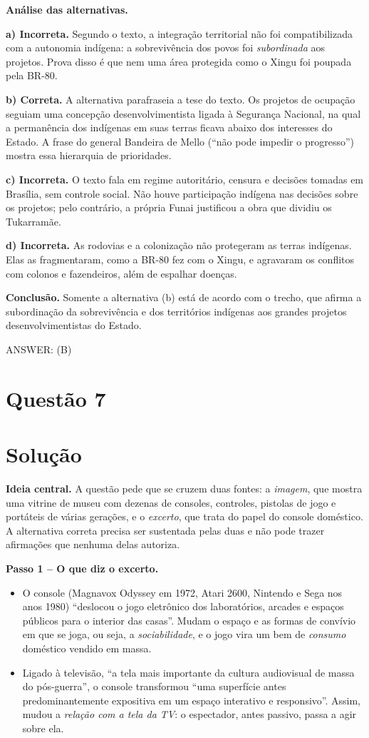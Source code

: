 \documentclass{article}%
\begin{document}
\textbf{Análise das alternativas.}

\textbf{a) Incorreta.} Segundo o texto, a integração territorial não foi compatibilizada com a autonomia indígena: a sobrevivência dos povos foi \emph{subordinada} aos projetos. Prova disso é que nem uma área protegida como o Xingu foi poupada pela BR-80.

\textbf{b) Correta.} A alternativa parafraseia a tese do texto. Os projetos de ocupação seguiam uma concepção desenvolvimentista ligada à Segurança Nacional, na qual a permanência dos indígenas em suas terras ficava abaixo dos interesses do Estado. A frase do general Bandeira de Mello (``não pode impedir o progresso'') mostra essa hierarquia de prioridades.

\textbf{c) Incorreta.} O texto fala em regime autoritário, censura e decisões tomadas em Brasília, sem controle social. Não houve participação indígena nas decisões sobre os projetos; pelo contrário, a própria Funai justificou a obra que dividiu os Tukarramãe.

\textbf{d) Incorreta.} As rodovias e a colonização não protegeram as terras indígenas. Elas as fragmentaram, como a BR-80 fez com o Xingu, e agravaram os conflitos com colonos e fazendeiros, além de espalhar doenças.

\textbf{Conclusão.} Somente a alternativa (b) está de acordo com o trecho, que afirma a subordinação da sobrevivência e dos territórios indígenas aos grandes projetos desenvolvimentistas do Estado.

ANSWER: (B)%
\newpage%
\section*{Questão 7}

\section*{Solução}

\textbf{Ideia central.} A questão pede que se cruzem duas fontes: a \emph{imagem}, que mostra uma vitrine de museu com dezenas de consoles, controles, pistolas de jogo e portáteis de várias gerações, e o \emph{excerto}, que trata do papel do console doméstico. A alternativa correta precisa ser sustentada pelas duas e não pode trazer afirmações que nenhuma delas autoriza.

\medskip
\textbf{Passo 1 -- O que diz o excerto.}
\begin{itemize}
\item O console (Magnavox Odyssey em 1972, Atari 2600, Nintendo e Sega nos anos 1980) ``deslocou o jogo eletrônico dos laboratórios, arcades e espaços públicos para o interior das casas''. Mudam o espaço e as formas de convívio em que se joga, ou seja, a \emph{sociabilidade}, e o jogo vira um bem de \emph{consumo} doméstico vendido em massa.
\item Ligado à televisão, ``a tela mais importante da cultura audiovisual de massa do pós-guerra'', o console transformou ``uma superfície antes predominantemente expositiva em um espaço interativo e responsivo''. Assim, mudou a \emph{relação com a tela da TV}: o espectador, antes passivo, passa a agir sobre ela.
\end{itemize}
\end{document}

